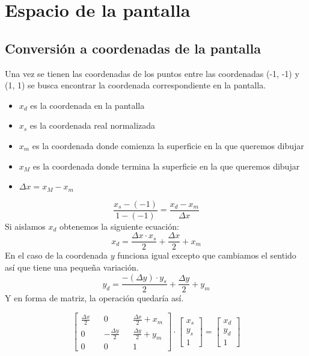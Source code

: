 \chapter{Espacio de la pantalla}
\section{Conversión a coordenadas de la pantalla}
Una vez se tienen las coordenadas de los puntos entre las coordenadas (-1, -1) y (1, 1) se busca encontrar la coordenada correspondiente en la pantalla.
\begin{itemize}
  \item{\(x_d\) es la coordenada en la pantalla}
  \item{\(x_s\) es la coordenada real normalizada}  
  \item{\(x_m\) es la coordenada donde comienza la superficie en la que queremos dibujar}
  \item{\(x_M\) es la coordenada donde termina la superficie en la que queremos dibujar}  
  \item{\(\Delta x = x_M - x_m\)}
\end{itemize}
\begin{equation*}
  \frac{x_s-(-1)}{1-(-1)} = \frac{x_d - x_m}{\Delta x}
\end{equation*}
Si aislamos \(x_d\) obtenemos la siguiente ecuación:
\begin{equation*}
  x_d = \frac{\Delta x \cdot x_s}{2}+\frac{\Delta x}{2}+x_m
\end{equation*}
En el caso de la coordenada \(y\) funciona igual excepto que cambiamos el sentido así que tiene una pequeña variación.
\begin{equation*}
  y_d = \frac{-(\Delta y) \cdot y_s}{2}+\frac{\Delta y}{2}+y_m
\end{equation*}
Y en forma de matriz, la operación quedaría así.

\begin{equation*}
  \begin{bmatrix}
     \frac{\Delta x}{2} && 0 && \frac{\Delta x}{2} + x_m\\
     0 && - \frac{\Delta y}{2} && \frac{\Delta y}{2} + y_m \\
     0 && 0 && 1
  \end{bmatrix}
  \cdot
  \begin{bmatrix}
    x_s\\
    y_s\\
    1
  \end{bmatrix}
  =
  \begin{bmatrix}
    x_d\\
    y_d\\
    1
  \end{bmatrix}
\end{equation*}
\restoregeometry

